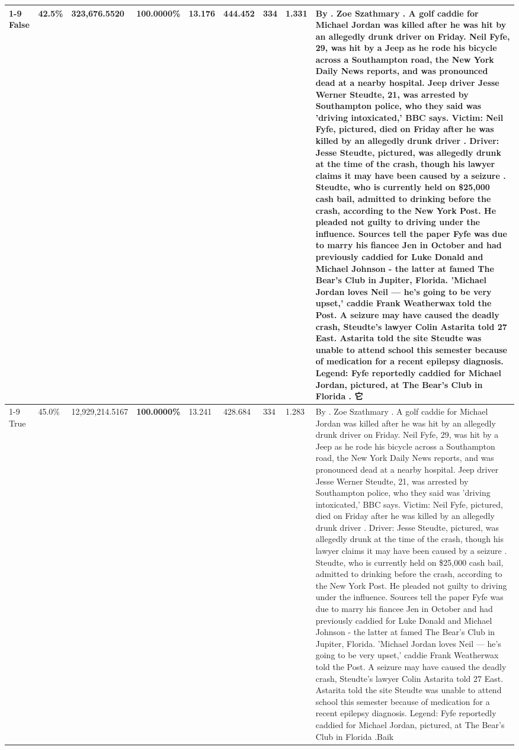 \begin{table}[H]
\begin{tabular}{lllrlllll}
\cline{1-9}
False & 42.5\% & 323,676.5520 & \bfseries \color{red} 100.0000\% & 13.176 & 444.452 & 334 & 1.331 & By . Zoe Szathmary . A golf caddie for Michael Jordan was killed after he was hit by an allegedly drunk driver on Friday. Neil Fyfe, 29, was hit by a Jeep as he rode his bicycle across a Southampton road, the New York Daily News reports, and was pronounced dead at a nearby hospital. Jeep driver Jesse Werner Steudte, 21, was arrested by Southampton police, who they said was 'driving intoxicated,' BBC says. Victim: Neil Fyfe, pictured, died on Friday after he was killed by an allegedly drunk driver . Driver: Jesse Steudte, pictured, was allegedly drunk at the time of the crash, though his lawyer claims it may have been caused by a seizure . Steudte, who is currently held on \$25,000 cash bail, admitted to drinking before the crash, according to the New York Post. He pleaded not guilty to driving under the influence. Sources tell the paper Fyfe was due to marry his fiancee Jen in October and had previously caddied for Luke Donald and Michael Johnson - the latter at famed The Bear's Club in Jupiter, Florida. 'Michael Jordan loves Neil — he’s going to be very upset,' caddie Frank Weatherwax told the Post. A seizure may have caused the deadly crash, Steudte's lawyer Colin Astarita told 27 East. Astarita told the site Steudte was unable to attend school this semester because of medication for a recent epilepsy diagnosis. Legend: Fyfe reportedly caddied for Michael Jordan, pictured, at The Bear's Club in Florida . 它 \\
\cline{1-9}
True & 45.0\% & 12,929,214.5167 & \bfseries \color{red} 100.0000\% & 13.241 & 428.684 & 334 & 1.283 & By . Zoe Szathmary . A golf caddie for Michael Jordan was killed after he was hit by an allegedly drunk driver on Friday. Neil Fyfe, 29, was hit by a Jeep as he rode his bicycle across a Southampton road, the New York Daily News reports, and was pronounced dead at a nearby hospital. Jeep driver Jesse Werner Steudte, 21, was arrested by Southampton police, who they said was 'driving intoxicated,' BBC says. Victim: Neil Fyfe, pictured, died on Friday after he was killed by an allegedly drunk driver . Driver: Jesse Steudte, pictured, was allegedly drunk at the time of the crash, though his lawyer claims it may have been caused by a seizure . Steudte, who is currently held on \$25,000 cash bail, admitted to drinking before the crash, according to the New York Post. He pleaded not guilty to driving under the influence. Sources tell the paper Fyfe was due to marry his fiancee Jen in October and had previously caddied for Luke Donald and Michael Johnson - the latter at famed The Bear's Club in Jupiter, Florida. 'Michael Jordan loves Neil — he’s going to be very upset,' caddie Frank Weatherwax told the Post. A seizure may have caused the deadly crash, Steudte's lawyer Colin Astarita told 27 East. Astarita told the site Steudte was unable to attend school this semester because of medication for a recent epilepsy diagnosis. Legend: Fyfe reportedly caddied for Michael Jordan, pictured, at The Bear's Club in Florida .Baik \\

\end{tabular}
\end{table}
